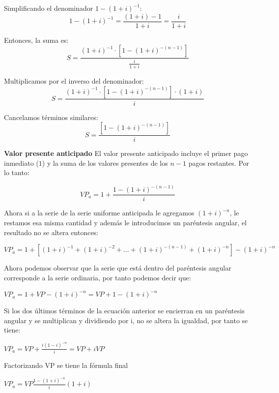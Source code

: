 	Simplificando el denominador \(1 - (1+i)^{-1}\):
	\[
	1 - (1+i)^{-1} = \frac{(1+i) - 1}{1+i} = \frac{i}{1+i}
	\]

	Entonces, la suma es:
	\[
	S = \frac{(1+i)^{-1} \cdot \left[1 - (1+i)^{-(n-1)}\right]}{\frac{i}{1+i}}
	\]

	Multiplicamos por el inverso del denominador:
	\[
	S = \frac{(1+i)^{-1} \cdot \left[1 - (1+i)^{-(n-1)}\right] \cdot (1+i)}{i}
	\]

	Cancelamos términos similares:
	\[
	S = \frac{\left[1 - (1+i)^{-(n-1)}\right]}{i}
	\]

	\textbf{Valor presente anticipado}
	El valor presente anticipado incluye el primer pago inmediato (\(1\)) y la suma de los valores presentes de los \(n-1\) pagos restantes. Por lo tanto:

	\[
	VP_a = 1 + \frac{1 - (1+i)^{-(n-1)}}{i}
	\]


	Ahora si a la serie de la serie uniforme anticipada le agregamos $(1+i)^{-n}$, le restamos esa misma cantidad y además le introducimos un paréntesis angular, el resultado no se altera entonces:

	\vspace{5mm}
\begin{center}
$VP_{a}= 1+[(1+i)^{-1} +(1+i)^{-2}+...+(1+i)^{-(n-1)} +(1+i)^{-n} ] -(1+i)^{-n}$
\end{center}
	\vspace{5mm}
	Ahora podemos observar que la serie que está dentro del paréntesis angular corresponde a la serie ordinaria, por tanto podemos decir que:

	\vspace{5mm}
\begin{center}
$VP_{a}= 1+VP-(1+i)^{-n}=VP+1-(1+i)^{-n}$
	\vspace{5mm}
\end{center}
	Si los dos últimos términos de la ecuación anterior se encierran en un paréntesis angular y se multiplican y dividiendo por i, no se altera la igualdad, por tanto se tiene:

	\vspace{5mm}
 \begin{center}
$VP_{a}=VP+\frac{i (1-i)^{-n} }{i}=VP+iVP$
\end{center}
	\vspace{5mm}

	Factorizando VP se tiene la fórmula final

	\vspace{5mm}
 \begin{center}
$VP_{a}=VP \frac{1-(1+i)^{-n}}{i}(1+i)$ \hspace{35pt}{Valor presente de una serie uniforme anticipada}\\
\end{center}
	\vspace{5mm}

